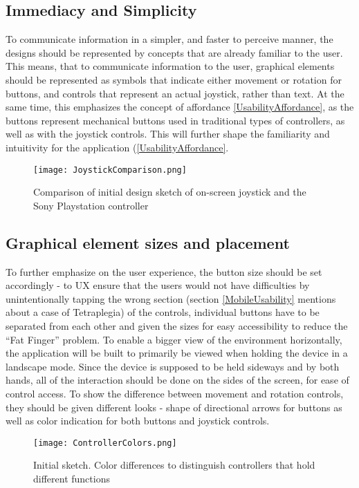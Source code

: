 \subsection{Immediacy and Simplicity}
To communicate information in a simpler, and faster to perceive manner, the designs should be represented by concepts that are already familiar to the user. This means, that to communicate information to the user, graphical elements should be represented as symbols that indicate either movement or rotation for buttons, and controls that represent an actual joystick, rather than
text. At the same time, this emphasizes the concept of affordance \ref{UsabilityAffordance}, as the buttons represent	mechanical buttons used in traditional types of controllers, as well as with the joystick controls. This will further shape the familiarity and intuitivity for the application (\ref{UsabilityAffordance}.

\begin{figure}[H]
\centering
\texttt{[image: JoystickComparison.png]}
\caption{Comparison of initial design sketch of on-screen joystick and the Sony Playstation controller}
\end{figure}

\subsection{Graphical element sizes and placement}
To further emphasize on the user experience, the button size should be set accordingly - 
to UX ensure that the users would not have difficulties by unintentionally tapping the wrong section (section \ref{MobileUsability} mentions about a case of Tetraplegia) of the controls, individual buttons have to be separated from each other and given the sizes for easy accessibility to reduce the “Fat Finger” problem. To enable a bigger view of the environment horizontally, the application will be built to primarily be viewed when holding the device in a landscape mode. Since the device is supposed to be held sideways and by both hands, all of the interaction should be done on the sides of the screen, for ease of control access.
To show the difference between movement and rotation controls, they should be given different looks - shape of directional arrows for buttons as well as color indication for both buttons and joystick controls.

\begin{figure}[H]
\centering
\texttt{[image: ControllerColors.png]}
\caption{Initial sketch. Color differences to distinguish controllers that hold different functions}
\end{figure}

